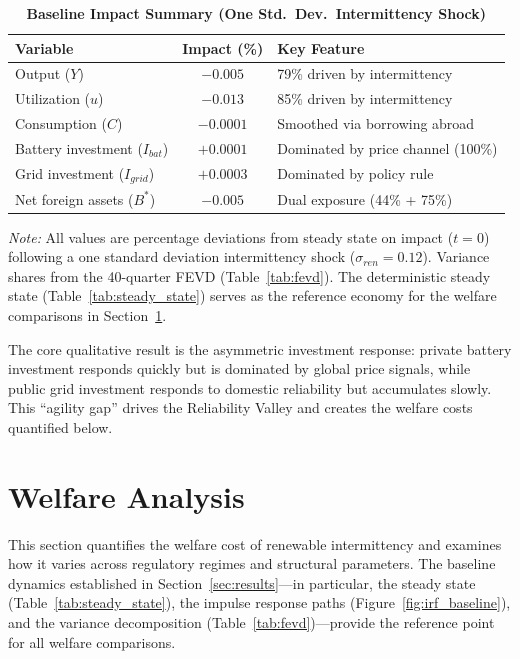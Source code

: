 \documentclass[12pt, a4paper]{article}
\begin{document}
\begin{table}[H]
    \centering
    \caption{\textbf{Baseline Impact Summary (One Std.\ Dev.\ Intermittency Shock)}}
    \label{tab:baseline_summary}
    \renewcommand{\arraystretch}{1.3}
    \small
    \begin{tabular}{l c l}
        \toprule
        \textbf{Variable} & \textbf{Impact (\%)} & \textbf{Key Feature} \\
        \midrule
        Output ($Y$) & $-0.005$ & 79\% driven by intermittency \\
        Utilization ($u$) & $-0.013$ & 85\% driven by intermittency \\
        Consumption ($C$) & $-0.0001$ & Smoothed via borrowing abroad \\
        Battery investment ($I_{bat}$) & $+0.0001$ & Dominated by price channel (100\%) \\
        Grid investment ($I_{grid}$) & $+0.0003$ & Dominated by policy rule \\
        Net foreign assets ($B^*$) & $-0.005$ & Dual exposure (44\% + 75\%) \\
        \bottomrule
    \end{tabular}
    \vspace{0.2cm}
    \parbox{\textwidth}{\footnotesize \textit{Note:} All values are percentage deviations from steady state on impact ($t=0$) following a one standard deviation intermittency shock ($\sigma_{ren} = 0.12$). Variance shares from the 40-quarter FEVD (Table~\ref{tab:fevd}). The deterministic steady state (Table~\ref{tab:steady_state}) serves as the reference economy for the welfare comparisons in Section~\ref{sec:welfare}.}
\end{table}

\noindent The core qualitative result is the asymmetric investment response: private battery investment responds quickly but is dominated by global price signals, while public grid investment responds to domestic reliability but accumulates slowly. This ``agility gap'' drives the Reliability Valley and creates the welfare costs quantified below.

\section{Welfare Analysis} \label{sec:welfare}

This section quantifies the welfare cost of renewable intermittency and examines how it varies across regulatory regimes and structural parameters. The baseline dynamics established in Section~\ref{sec:results}---in particular, the steady state (Table~\ref{tab:steady_state}), the impulse response paths (Figure~\ref{fig:irf_baseline}), and the variance decomposition (Table~\ref{tab:fevd})---provide the reference point for all welfare comparisons.
\end{document}
